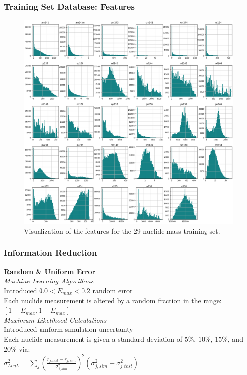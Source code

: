 \begin{frame}
  \frametitle{Training Set Database: Features}
  \begin{figure}
    \centering
      \includegraphics[height=0.8\textheight]{./figures/histograms_trainset_features.png}
      \caption{Visualization of the features for the 29-nuclide mass training set.}
  \end{figure}
\end{frame}

\begin{frame}
  \frametitle{Information Reduction}
  \textbf{\large Random \& Uniform Error} \\
  \bigskip
  \textit{Machine Learning Algorithms} \\ \medskip
  Introduced $0.0 < E_{max} < 0.2$ random error\\ \smallskip
  Each nuclide measurement is altered by a random fraction in the range: $[1-E_{max},1+E_{max}]$\\
  \bigskip
  \textit{Maximum Likelihood Calculations} \\ \medskip
  Introduced uniform simulation uncertainty\\ \smallskip
  Each nuclide measurement is given a standard deviation of $5\%$, $10\%$, $15\%$, and $20\%$ via: \\
  $\sigma_{Log L}^2 = \sum_j \left( \frac{r_{j,test} - r_{j,sim}}{\sigma_{j,sim}^2} \right)^2 (\sigma_{j,sim}^2 + \sigma_{j,test}^2)$
\end{frame}

